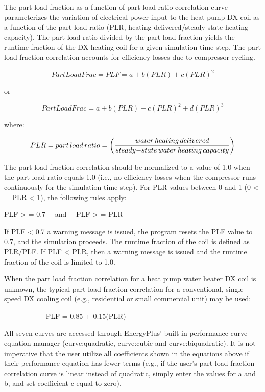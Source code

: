 The part load fraction as a function of part load ratio correlation curve parameterizes the variation of electrical power input to the heat pump DX coil as a function of the part load ratio (PLR, heating delivered/steady-state heating capacity). The part load ratio divided by the part load fraction yields the runtime fraction of the DX heating coil for a given simulation time step. The part load fraction correlation accounts for efficiency losses due to compressor cycling.

\begin{equation}
PartLoadFrac = PLF = a + b\left( {PLR} \right) + c{\left( {PLR} \right)^2}
\end{equation}

or

\begin{equation}
PartLoadFrac = a + b\left( {PLR} \right) + c{\left( {PLR} \right)^2} + d{\left( {PLR} \right)^3}
\end{equation}

where:

\begin{equation}
PLR = part\,load\,ratio = \left( {\frac{{water\,heating\,delivered}}{{steady{\rm{ - }}state\,water\,heating\,capacity}}} \right)
\end{equation}

The part load fraction correlation should be normalized to a value of 1.0 when the part load ratio equals 1.0 (i.e., no efficiency losses when the compressor runs continuously for the simulation time step). For PLR values between 0 and 1 (0 \textless{} = PLR \textless{} 1), the following rules apply:

PLF \textgreater{} = 0.7~~ and~~ PLF \textgreater{} = PLR

If PLF \textless{} 0.7 a warning message is issued, the program resets the PLF value to 0.7, and the simulation proceeds. The runtime fraction of the coil is defined as PLR/PLF. If PLF \textless{} PLR, then a warning message is issued and the runtime fraction of the coil is limited to 1.0.

When the part load fraction correlation for a heat pump water heater DX coil is unknown, the typical part load fraction correlation for a conventional, single-speed DX cooling coil (e.g., residential or small commercial unit) may be used:

~~~~~~~~~~~ PLF = 0.85 + 0.15(PLR)

All seven curves are accessed through EnergyPlus' built-in performance curve equation manager (curve:quadratic, curve:cubic and curve:biquadratic). It is not imperative that the user utilize all coefficients shown in the equations above if their performance equation has fewer terms (e.g., if the user's part load fraction correlation curve is linear instead of quadratic, simply enter the values for a and b, and set coefficient c equal to zero).

